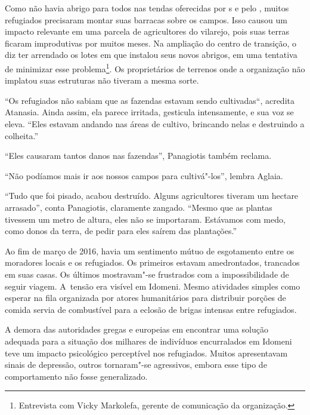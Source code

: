 Como não havia abrigo para todos nas tendas oferecidas por s e pelo  ,
muitos refugiados precisaram montar suas barracas sobre os campos. Isso
causou um impacto relevante em uma parcela de agricultores do vilarejo,
pois suas terras ficaram improdutivas por muitos meses. Na ampliação
do centro de transição, o  diz ter arrendado os lotes em que instalou
seus novos abrigos, em uma tentativa de minimizar esse
problema\footnote{ Entrevista com Vicky Markolefa, gerente de
comunicação da organização.}. Os proprietários de terrenos onde a organização
não implatou suas estruturas não tiveram a mesma sorte.

``Os refugiados não sabiam que as fazendas estavam sendo cultivadas``,
acredita Atanasia. Ainda assim, ela parece irritada, gesticula
intensamente, e sua voz se eleva. ``Eles estavam andando nas áreas de
cultivo, brincando nelas e destruindo a colheita.''

``Eles causaram tantos danos nas fazendas'', Panagiotis também reclama.

``Não podíamos mais ir aos nossos campos para cultivá"-los'', lembra
Aglaia.

``Tudo que foi pisado, acabou destruído. Alguns agricultores tiveram um
hectare arrasado'', conta Panagiotis, claramente zangado. ``Mesmo que
as plantas tivessem um metro de altura, eles não se importaram.
Estávamos com medo, como donos da terra, de pedir para eles saírem das
plantações.''


Ao fim de março de 2016, havia um sentimento mútuo de esgotamento entre os
moradores locais e os refugiados. Os primeiros estavam amedrontados,
trancados em suas casas. Os últimos mostravam"-se frustrados com a
impossibilidade de seguir viagem. A~tensão era visível em Idomeni. Mesmo
atividades simples como esperar na fila organizada por atores
humanitários para distribuir porções de comida servia de combustível
para a eclosão de brigas intensas entre refugiados.

A demora das autoridades gregas e europeias em encontrar uma solução
adequada para a situação dos milhares de indivíduos encurralados em
Idomeni teve um impacto psicológico perceptível nos refugiados. Muitos
apresentavam sinais de depressão, outros tornaram"-se agressivos, embora
esse tipo de comportamento não fosse generalizado.

